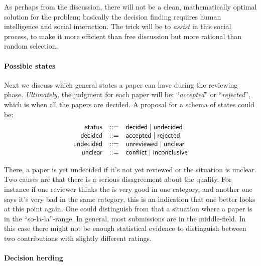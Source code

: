 \medskip

As perhaps from the discussion, there will not be a clean, mathematically
optimal solution for the problem; basically the decision finding requires
human intelligence and social interaction. The trick will be to
\emph{assist} in this social process, to make it more efficient than free
discussion but more rational than random selection.




\paragraph{Possible states}
\label{sec:possiblestates}

Next we discuss which general states a paper can have during the reviewing
phase. \emph{Ultimately,} the judgment for each paper will be:
``\emph{accepted}'' or ``\emph{rejected}'', which is when all the papers
are decided. A proposal for a schema of states could be:
\begin{displaymath}
  \begin{array}[rcl]{rcl}
    \mathsf{status} & \bnfdef & \mathsf{decided} \bnfbar \mathsf{undecided}
    \\
    \mathsf{decided} & \bnfdef & \mathsf{accepted} \bnfbar \mathsf{rejected}
    \\
    \mathsf{undecided} & \bnfdef & \mathsf{unreviewed} \bnfbar \mathsf{unclear}
    \\
    \mathsf{unclear}  & \bnfdef & \mathsf{conflict}  \bnfbar \mathsf{inconclusive}
  \end{array}
\end{displaymath}

There, a paper is yet undecided if it's not yet reviewed or the situation
is unclear. Two causes are that there is a serious disagreement about the
quality. For instance if one reviewer thinks the is very good in one
category, and another one says it's very bad in the same category, this is
an indication that one better looks at this point again. One could
distinguish from that a situation where a paper is in the
``so-la-la''-range. In general, most submissions are in the middle-field.
In this case there might not be enough statistical evidence to distinguish
between two contributions with slightly different ratings.




\paragraph{Decision herding}

